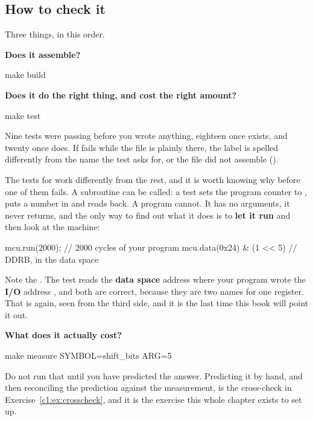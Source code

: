 \subsection{How to check it}
\label{c1:sec:check}
Three things, in this order.

\textbf{Does it assemble?}

\begin{shell}
make build
\end{shell}

\textbf{Does it do the right thing, and cost the right amount?}

\begin{shell}
make test
\end{shell}

Nine tests were passing before you wrote anything, eighteen once  exists, and
twenty once  does. If  fails while the file is
plainly there, the label is spelled differently from the name the test asks for, or the file did
not assemble ().

The tests for  work differently from the rest, and it is worth knowing why before
one of them fails. A subroutine can be called: a test sets the program counter to
, puts a number in  and reads  back. A program cannot. It has
no arguments, it never returns, and the only way to find out what it does is to \textbf{let it
run} and then look at the machine:

\begin{cppcode}
mcu.run(2000);                      // 2000 cycles of your program
mcu.data(0x24) & (1 << 5)           // DDRB, in the data space
\end{cppcode}

Note the . The test reads the \textbf{data space} address where your program wrote the
\textbf{I/O} address , and both are correct, because they are two names for one
register. That is  again, seen from the third side, and it is the last time
this book will point it out.

\textbf{What does it actually cost?}

\begin{shell}
make measure SYMBOL=shift_bits ARG=5
\end{shell}

Do not run that until you have predicted the answer. Predicting it by hand, and then reconciling
the prediction against the measurement, is the cross-check in Exercise~\ref{c1:ex:crosscheck}, and
it is the exercise this whole chapter exists to set up.
